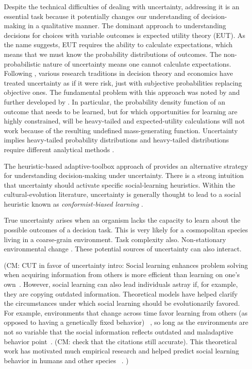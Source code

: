 \documentclass[letterpaper,11.5pt]{scrartcl}
\newcommand{\cm}[1]{{\textcolor{mypurple} {({\tiny CM:} #1)}}}
\begin{document}
Despite the technical difficulties of dealing with uncertainty, addressing it is an essential task because it potentially changes our understanding of decision-making in a qualitative manner. The dominant approach to understanding decisions for choices with variable outcomes is expected utility theory (EUT). As the name suggests, EUT requires the ability to calculate expectations, which means that we must know the probability distributions of outcomes. The non-probabilistic nature of uncertainty means one cannot calculate expectations. Following \cite{savage1954}, various research traditions in decision theory and economics have treated uncertainty as if it were risk, just with subjective probabilities replacing objective ones. The fundamental problem with this approach was noted by \cite{geweke2001} and further developed by \cite{weitzman2009}. In particular, the probability density function of an outcome that needs to be learned, but for which opportunities for learning are highly constrained, will be heavy-tailed and expected-utility calculations will not work because of the resulting undefined mass-generating function. Uncertainty implies heavy-tailed probability distributions and heavy-tailed distributions require different analytical methods \cite{nair_etal2022}.

The heuristic-based adaptive-toolbox approach of \cite{todd_gigerenzer2000} provides an alternative strategy for understanding decision-making under uncertainty. There is a strong intuition that uncertainty should activate specific social-learning heuristics. Within the cultural-evolution literature, uncertainty is generally thought to lead to a social heuristic known as \emph{conformist-biased learning} \cite{boyd_richerson1985, henrich_boyd1998, muthukrishna_etal2016}.

True uncertainty arises when an organism lacks the capacity to learn about the possible outcomes of a decision task. This is very likely for a cosmopolitan species living in a coarse-grain environment. Task complexity also. Non-stationary environmental change \cite{kay_king2020}. These potential sources of uncertainty can also interact. 


\cm{CUT in favor of uncertainty intro: Social learning enhances problem solving when acquiring information from others is more efficient than learning on one's own~\cite{Laland2004}. However, social learning can also lead individuals astray if, for example, they are copying outdated information. Theoretical models have helped clarify the circumstances under which social learning should be evolutionarily favored. For example, environments that change across time favor learning from others (as opposed to having a genetically fixed behavior) ~\cite{BoydRicherson1985,Henrich1998}, so long as the environments are not so variable that the social information reflects outdated and maladaptive behavior point~\cite{Rogers1988,Feldman1996, aoki2014evolution}. \cm{check that the citations still accurate}. This theoretical work has motivated much empirical research and helped predict social learning behavior in humans and other species ~\cite{McElreath2005,Kendal2018,Allen2019}.
}
\end{document}
